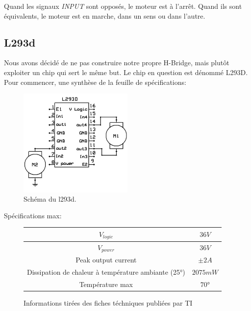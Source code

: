 \documentclass[a4paper,12pt]{article}
\begin{document}
{\begin{table}[h]
\caption{\label{tableDeVerite} Table de v\'erit\'e accompagnant le sch\'ema du
H-bridge (fig.(\ref{H-bridge}))}

Quand les signaux \emph{INPUT} sont oppos\'es, le moteur est \`a
l'arr\^et. Quand ils sont \'equivalents, le moteur est en marche, dans un sens
ou dans l'autre.

\end{table}

\subsection{L293d}
Nous avons décidé de ne pas construire notre propre H-Bridge, mais plutôt
exploiter un chip qui sert le même but. Le chip en question est dénommé
L293D. Pour commencer, une synthèse de la feuille de spécifications:

\begin{figure}[h]
\centering
\includegraphics[width=0.5\textwidth]{figures/l293d}
    \caption{\label{l293d} Schéma du l293d.
    \protect\footnotemark}
\end{figure}
Spécifications max:

\begin{center}
\begin{figure}[ht]
  \begin{tabular}{|c|c|}
    \hline
    $V_{logic}$ & $36V$\\
    \hline
    $V_{power}$ & $36V$\\
    \hline
    Peak output current & $\pm 2A$\\
    \hline
    Dissipation de chaleur à température ambiante (25°) & $2075mW$\\
    \hline
    Température max & $70°$\\
    \hline
   
  \end{tabular}
 \caption{\label{l293dMax} Informations tirées des fiches téchniques publiées
      par TI \cite{l293dDataSheet}}
  \end{figure}
\end{center}


}
\end{document}

